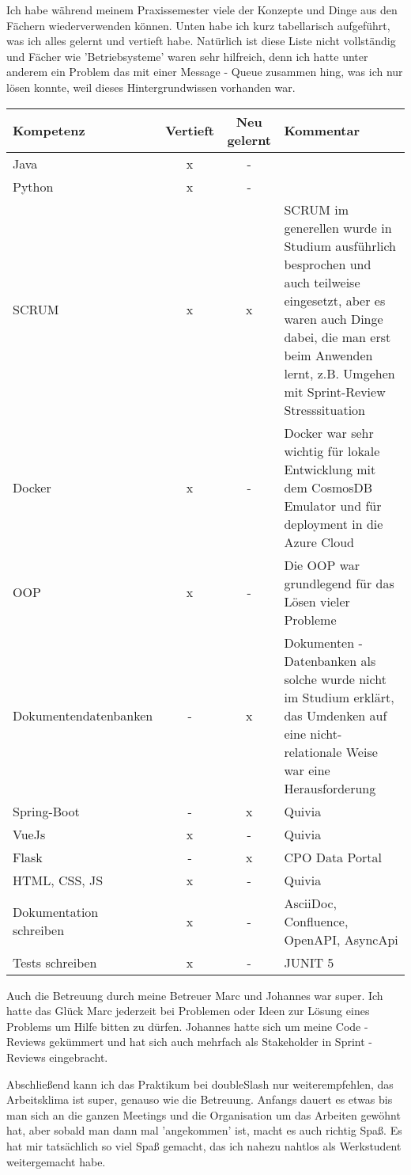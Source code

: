 Ich habe während meinem Praxissemester viele der Konzepte und Dinge aus den Fächern wiederverwenden können. Unten habe ich kurz tabellarisch 
aufgeführt, was ich alles gelernt und vertieft habe. Natürlich ist diese Liste nicht vollständig und Fächer wie 'Betriebsysteme' waren sehr 
hilfreich, denn ich hatte unter anderem ein Problem das mit einer Message - Queue zusammen hing, was ich nur lösen konnte, weil 
dieses Hintergrundwissen vorhanden war. 

\begin{xltabular}{\linewidth}{l|c|c|X}
  Kompetenz & Vertieft                                 & Neu gelernt       & Kommentar \\
  \hline
  Java & x & - & \\ 
  \hline
  Python & x & - & \\ 
  \hline
  SCRUM & x & x & SCRUM im generellen wurde in Studium ausführlich besprochen und auch teilweise eingesetzt, aber es waren auch Dinge dabei, die man erst beim Anwenden lernt, z.B. Umgehen mit Sprint-Review Stresssituation \\
  \hline
  Docker & x & - & Docker war sehr wichtig für lokale Entwicklung mit dem CosmosDB Emulator und für deployment in die Azure Cloud \\
  \hline
  OOP & x & - & Die OOP war grundlegend für das Lösen vieler Probleme \\
  \hline
  Dokumentendatenbanken & - & x & Dokumenten - Datenbanken als solche wurde nicht im Studium erklärt, das Umdenken auf eine nicht-relationale Weise war eine Herausforderung \\
  \hline
  Spring-Boot & - & x & Quivia \\
  \hline
  VueJs & x & - & Quivia \\
  \hline 
  Flask & - & x & CPO Data Portal \\ 
  \hline
  HTML, CSS, JS & x & - & Quivia \\ 
  \hline
  Dokumentation schreiben & x & - & AsciiDoc, Confluence, OpenAPI, AsyncApi \\ 
  \hline 
  Tests schreiben & x & - & JUNIT 5 \\
  \hline
\end{xltabular}

\newpage

Auch die Betreuung durch meine Betreuer Marc und Johannes war super. Ich hatte das Glück 
Marc jederzeit bei Problemen oder Ideen zur Lösung eines Problems um Hilfe bitten zu dürfen. Johannes 
hatte sich um meine Code - Reviews gekümmert und hat sich auch mehrfach als Stakeholder in 
Sprint - Reviews eingebracht.

Abschließend kann ich das Praktikum bei doubleSlash nur weiterempfehlen, das Arbeitsklima ist super, 
genauso wie die Betreuung. Anfangs dauert es etwas bis man sich an die ganzen Meetings und die 
Organisation um das Arbeiten gewöhnt hat, aber sobald man dann mal 'angekommen' ist, macht es auch richtig Spaß. 
Es hat mir tatsächlich so viel Spaß gemacht, das ich nahezu nahtlos als Werkstudent weitergemacht habe.
